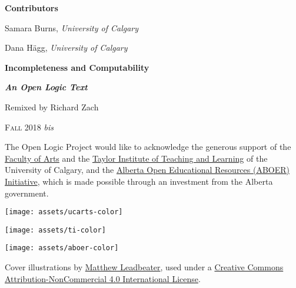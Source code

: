 \textbf{\color{leadbeater}Contributors}

\medskip

Samara Burns, \emph{University of Calgary}

Dana H\"agg, \emph{University of Calgary}

\newpage


\vspace*{100pt}

\begin{raggedleft}

{\fontsize{24pt}{24pt}\selectfont\bfseries\sffamily%
  Incompleteness and Computability}

\smallskip

{\fontsize{18pt}{18pt}\selectfont\bfseries\itshape An Open Logic Text}

\vspace{100pt}

\fontsize{14pt}{14pt}\selectfont Remixed by Richard Zach

\vfill

\textsc{Fall 2018} \textit{bis}

\end{raggedleft}


\newpage


\noindent
The Open Logic Project would like to acknowledge the generous support
of the \href{http://arts.ucalgary.ca/}{Faculty of Arts} and
the \href{http://www.ucalgary.ca/taylorinstitute/}{Taylor Institute of
Teaching and Learning} of the University of Calgary,
and the \href{http://albertaoer.com}{Alberta Open Educational Resources
(ABOER) Initiative}, which is made possible through an investment from
the Alberta government.



\bigskip

\noindent\texttt{[image: assets/ucarts-color]}

\medskip

\noindent\texttt{[image: assets/ti-color]}

\medskip

\noindent\texttt{[image: assets/aboer-color]}

\vfill

\noindent Cover illustrations by \href{http://mattleadbeater.com}{Matthew
  Leadbeater}, used under a
\href{http://creativecommons.org/licenses/by-nc/4.0/}{Creative Commons
  Attribution-NonCommercial 4.0 International License}.

